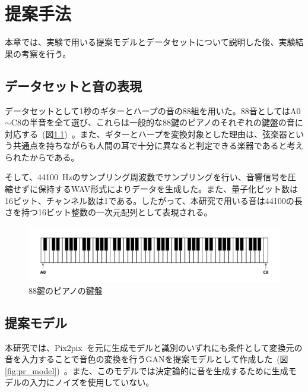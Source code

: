 \chapter{提案手法}

本章では、実験で用いる提案モデルとデータセットについて説明した後、実験結果の考察を行う。

\section{データセットと音の表現}

データセットとして1秒のギターとハープの音の88組を用いた。88音としてはA0$\sim$C8の半音を全て選び、これらは一般的な88鍵のピアノのそれぞれの鍵盤の音に対応する~(図\ref{fig:piano})~。また、ギターとハープを変換対象とした理由は、弦楽器という共通点を持ちながらも人間の耳で十分に異なると判定できる楽器であると考えられたからである。

そして、44100~Hzのサンプリング周波数でサンプリングを行い、音響信号を圧縮せずに保持するWAV形式によりデータを生成した。また、量子化ビット数は16ビット、チャンネル数は1である。したがって、本研究で用いる音は44100の長さを持つ16ビット整数の一次元配列として表現される。

\begin{figure}[b]
\begin{center}
\includegraphics[width=0.9\hsize]{figure/piano.png}
\caption{88鍵のピアノの鍵盤}
\label{fig:piano}
\end{center}
\end{figure}


\section{提案モデル}
\label{sec:proposed}

本研究では、Pix2pix~\cite{pix2pix}を元に生成モデルと識別のいずれにも条件として変換元の音を入力することで音色の変換を行うGANを提案モデルとして作成した~(図\ref{fig:pr_model})~。また、このモデルでは決定論的に音を生成するために生成モデルの入力にノイズを使用していない。

